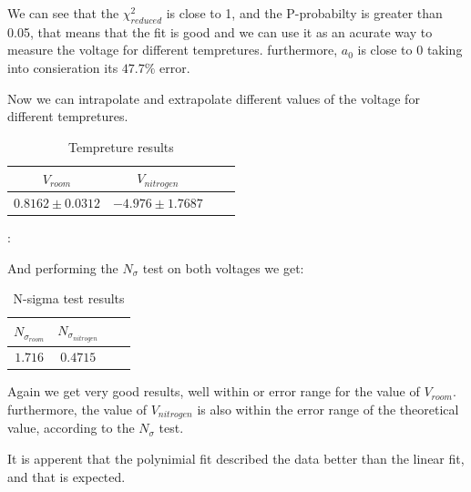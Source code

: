 \documentclass[12pt,a4paper]{article}
\begin{document}
  \begin{table}[htbp]
    \centering
    \label{tab:partA_summary}
    \caption{Part B results}
  \end{table}
  We can see that the $\chi _{reduced}^2$ is close to 1, and the P-probabilty is greater than 0.05, that means that the fit is good and we can use it as an acurate way to measure the voltage for different tempretures. furthermore, $a_0$ is close to 0 taking into consieration its $47.7 \%$ error. 

  \pagebreak
  Now we can intrapolate and extrapolate different values of the voltage for different tempretures.
  \begin{table}[htbp]
    \centering
    \label{Part B tempreture results}
    \begin{tabular}{@{}cccc@{}}
      \toprule
       $V_{room}$ & $V_{nitrogen}$ \\
      \midrule
      $0.8162 \pm 0.0312$ & $-4.976 \pm 1.7687$ \\
      \bottomrule
    \end{tabular}
    \caption{Tempreture results}
\end{table}:

And performing the $N_\sigma$ test on both voltages we get:

\begin{table}[htbp]
    \centering
    \label{Part B N-sigma test results}
    \begin{tabular}{@{}cccc@{}}
      \toprule
       $N_{\sigma_{room}} $& $N_{\sigma_{nitrogen}}$ \\
      \midrule
      $1.716$ & $0.4715$ \\
      \bottomrule
    \end{tabular}
    \caption{N-sigma test results}

\end{table}
Again we get very good results, well within or error range for the value of $V_{room}$. furthermore, the value of $V_{nitrogen}$ is also within the error range of the theoretical value, according to the $N_\sigma$ test.

It is apperent that the polynimial fit described the data better than the linear fit, and that is expected. 
\end{document}
